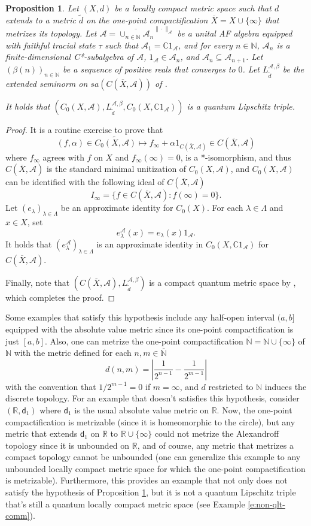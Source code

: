 \documentclass{amsart}
\theoremstyle{plain}
\newtheorem{proposition}[theorem]{Proposition}
\theoremstyle{definition}
\theoremstyle{remark}
\numberwithin{equation}{section}
\newcommand{\A}{{\mathcal{A}}}
\newcommand{\wt}[1]{{\widetilde{#1}}}
\newcommand{\la}{{\lambda}}
\newcommand{\La}{{\Lambda}}
\newcommand{\al}{{\alpha}}
\newcommand{\be}{{\beta}}
\newcommand{\dd}{{\mathsf{d}}}
\newcommand{\N}{{\mathds{N}}}
\newcommand{\R}{{\mathds{R}}}
\newcommand{\C}{{\mathds{C}}}
\begin{document}
\begin{proposition}\label{p:comm-ex}
    Let $(X, d)$ be a locally compact metric space such that $d$ extends to a metric $\wt{d}$ on the one-point compactification $\overline{X}=X\cup \{\infty\}$ that metrizes its topology. Let $\A=\overline{\cup_{n\in \N}\A_n}^{\|\cdot\|_\A}$ be a unital AF algebra equipped with faithful tracial state $\tau$ such that $\A_1=\C1_\A$, and for every $n\in \N$, $\A_n$ is a finite-dimensional C*-subalgebra of $\A$, $1_\A\in \A_n$, and $\A_n\subseteq \A_{n+1}$. Let $(\be(n))_{n\in \N}$ be a sequence of positive reals that converges to $0$.  Let $L_{\wt{d}}^{\A, \be}$ be the extended seminorm on $sa(C(\overline{X}, \A))$ of \cite[Theorem 3.10]{Aguilar19}. 
    
    
    It holds that $(C_0(X, \A), L_{\wt{d}}^{\A, \be}, C_0(X, \C1_\A))$ is a quantum Lipschitz triple.
\end{proposition}
\begin{proof}
It is a routine exercise to prove that 
\[
(f,\al) \in \wt{C_0(X,\A)} \longmapsto f_\infty +\al 1_{C(\overline{X}, \A)}\in  C(\overline{X}, \A)
\]
where $f_\infty$ agrees with $f$ on $X$ and $f_\infty(\infty)=0$, is a *-isomorphism, and thus $C(\overline{X}, \A)$ is the standard minimal unitization of $C_0(X, \A)$, and $C_0(X, \A)$ can be identified with the following ideal of $C(\overline{X}, \A)$
\[
I_\infty = \{f \in C(\overline{X}, \A) : f(\infty)=0\}.
\] 
Let $(e_\la)_{\la\in \La}$ be an approximate identity for $C_0(X)$. For each $\la\in \La$ and $x\in X$, set 
\[
e^\A_\la(x)=e_\la(x)1_\A. 
\]
It holds that $(e_\la^\A)_{\la\in \La}$ is an approximate identity in $C_0(X, \C1_\A)$ for $C(\overline{X}, \A)$.

Finally, note that  $(C(\overline{X}, \A),  L_{\wt{d}}^{\A, \be})$ is a compact quantum metric space  by \cite[Theorem 3.10]{Aguilar19}, which completes the proof.
\end{proof}
Some examples that satisfy this hypothesis include any half-open interval $(a,b]$ equipped with the absolute value metric since its one-point compactification is just $[a,b]$. Also, one can metrize the one-point compactification  $\overline{\N}=\N\cup \{\infty\}$ of $\N$ with the metric defined for each $n,m\in \overline{\N}$
\[
d(n,m)= 
    \left|\frac{1}{2^{n-1}}-\frac{1}{2^{m-1}}\right|
\]
with the convention that $1/2^{m-1}=0$ if $m=\infty$, and $d$ restricted to $\N$ induces the discrete topology. For an example that doesn't satisfies this hypothesis, consider $(\R, \dd_1)$ where $\dd_1$ is the usual absolute value metric on $\R$. Now, the one-point compactification is metrizable (since it is homeomorphic to the circle), but any metric that extends $\dd_1$ on $\R$ to $\R\cup \{\infty\}$ could not metrize the Alexandroff topology since it is unbounded on $\R$, and of course, any metric that metrizes a compact topology cannot be unbounded (one can generalize this example to any unbounded locally compact metric space for which the one-point compactification is metrizable).  Furthermore, this provides an example that not only does not satisfy the hypothesis of Proposition \ref{p:comm-ex}, but it is not a quantum Lipschitz triple that's still a quantum locally compact metric space (see Example \ref{e:non-qlt-comm}).
\end{document}
